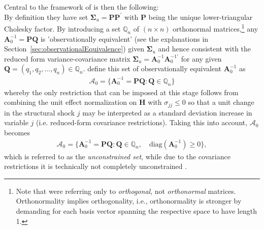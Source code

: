 \documentclass[a4paper,11pt,listof=nochaptergap,oneside,pointednumbers,bibtotoc,bigheadings,liststotoc,hidelinks]{scrbook}
\theoremstyle{mysatz}
\theoremstyle{mydefinition}
\theoremstyle{mytheorem}
\theoremstyle{mybemerkung}
\newcommand{\vect}[1]{\boldsymbol{\mathbf{#1}}}
\begin{document}
Central to the framework of \citet{ludvigsonetal:18} is then the following: \\
By definition they have set $\vect{\Sigma}_u = \vect{P}\vect{P}^'$ with $\vect{P}$ being the unique lower-triangular Cholesky factor. By introducing a set $\mathbb{Q}_n$ of $(n \times n)$ orthonormal matrices,\footnote{Note that \citet{rubioetal:10} were referring only to \textit{orthogonal}, not \textit{orthonormal} matrices. Orthonormality implies orthogonality, i.e., orthonormality is stronger by demanding for each basis vector spanning the respective space to have length 1.} any $\vect{A}_0^{-1} = \vect{P}\vect{Q}$ is 'observationally equivalent' (see the explanations in Section~\ref{sec:observationalEquivalence}) given $\vect{\Sigma}_u$ and hence consistent with the reduced form variance-covariance matrix $\vect{\Sigma}_u = \vect{A}_0^{-1}\vect{A}_0^{-1'}$ for any given $\vect{Q} = (q_1, q_2, \dots, q_n) \in \mathbb{Q}_n$. \citet{ludvigsonetal:18} define this set of observationally equivalent $\vect{A}_0^{-1}$ as 
\begin{equation} \label{eq:svar_ludvi6}
\begin{split}
 			\mathcal{A}_0 = \{\vect{A}_0^{-1} = \vect{P}\vect{Q}: \vect{Q} \in \mathbb{Q}_n\}
\end{split}								
\end{equation}
whereby the only restriction that can be imposed at this stage follows from combining the unit effect normalization on $\vect{H}$ with $\sigma_{jj} \leq 0$ so that a unit change in the structural shock $j$ may be interpreted as a standard deviation increase in variable $j$ (i.e. reduced-form covariance restrictions). Taking this into account, $\mathcal{A}_0$ becomes
\begin{equation} \label{eq:svar_ludvi7}
\begin{split}
 			\vect{\mathcal{A}}_0 = \{\vect{A}_0^{-1} = \vect{P}\vect{Q}: \vect{Q} \in \mathbb{Q}_n, \quad \text{diag}(\vect{A}_0^{-1}) \geq 0\},
\end{split}								
\end{equation}
which is referred to as the \textit{unconstrained set}, while due to the covariance restrictions it is technically not completely unconstrained \citep{ludvigsonetal:19}.
\end{document}
